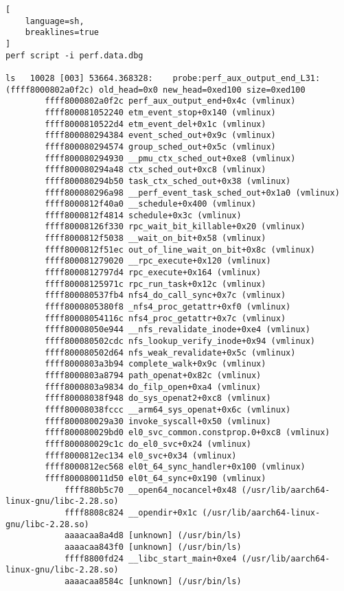 \documentclass[11pt]{diazessay} %
\begin{document}
\begin{lstlisting}[
  	language=sh,
	breaklines=true
]
perf script -i perf.data.dbg

ls   10028 [003] 53664.368328:    probe:perf_aux_output_end_L31: (ffff8000802a0f2c) old_head=0x0 new_head=0xed100 size=0xed100
        ffff8000802a0f2c perf_aux_output_end+0x4c (vmlinux)
        ffff800081052240 etm_event_stop+0x140 (vmlinux)
        ffff8000810522d4 etm_event_del+0x1c (vmlinux)
        ffff800080294384 event_sched_out+0x9c (vmlinux)
        ffff800080294574 group_sched_out+0x5c (vmlinux)
        ffff800080294930 __pmu_ctx_sched_out+0xe8 (vmlinux)
        ffff800080294a48 ctx_sched_out+0xc8 (vmlinux)
        ffff800080294b50 task_ctx_sched_out+0x38 (vmlinux)
        ffff800080296a98 __perf_event_task_sched_out+0x1a0 (vmlinux)
        ffff8000812f40a0 __schedule+0x400 (vmlinux)
        ffff8000812f4814 schedule+0x3c (vmlinux)
        ffff80008126f330 rpc_wait_bit_killable+0x20 (vmlinux)
        ffff8000812f5038 __wait_on_bit+0x58 (vmlinux)
        ffff8000812f51ec out_of_line_wait_on_bit+0x8c (vmlinux)
        ffff800081279020 __rpc_execute+0x120 (vmlinux)
        ffff8000812797d4 rpc_execute+0x164 (vmlinux)
        ffff80008125971c rpc_run_task+0x12c (vmlinux)
        ffff800080537fb4 nfs4_do_call_sync+0x7c (vmlinux)
        ffff8000805380f8 _nfs4_proc_getattr+0xf0 (vmlinux)
        ffff80008054116c nfs4_proc_getattr+0x7c (vmlinux)
        ffff80008050e944 __nfs_revalidate_inode+0xe4 (vmlinux)
        ffff800080502cdc nfs_lookup_verify_inode+0x94 (vmlinux)
        ffff800080502d64 nfs_weak_revalidate+0x5c (vmlinux)
        ffff8000803a3b94 complete_walk+0x9c (vmlinux)
        ffff8000803a8794 path_openat+0x82c (vmlinux)
        ffff8000803a9834 do_filp_open+0xa4 (vmlinux)
        ffff80008038f948 do_sys_openat2+0xc8 (vmlinux)
        ffff80008038fccc __arm64_sys_openat+0x6c (vmlinux)
        ffff800080029a30 invoke_syscall+0x50 (vmlinux)
        ffff800080029bd0 el0_svc_common.constprop.0+0xc8 (vmlinux)
        ffff800080029c1c do_el0_svc+0x24 (vmlinux)
        ffff8000812ec134 el0_svc+0x34 (vmlinux)
        ffff8000812ec568 el0t_64_sync_handler+0x100 (vmlinux)
        ffff800080011d50 el0t_64_sync+0x190 (vmlinux)
            ffff880b5c70 __open64_nocancel+0x48 (/usr/lib/aarch64-linux-gnu/libc-2.28.so)
            ffff8808c824 __opendir+0x1c (/usr/lib/aarch64-linux-gnu/libc-2.28.so)
            aaaacaa8a4d8 [unknown] (/usr/bin/ls)
            aaaacaa843f0 [unknown] (/usr/bin/ls)
            ffff8800fd24 __libc_start_main+0xe4 (/usr/lib/aarch64-linux-gnu/libc-2.28.so)
            aaaacaa8584c [unknown] (/usr/bin/ls)


\end{lstlisting}
\end{document}
